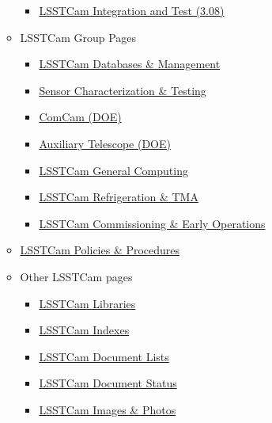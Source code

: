 \begin{small}
\begin{itemize}
\begin{itemize}
\begin{itemize}
			\item \href{https://confluence.slac.stanford.edu/display/LSSTCAM/3.08+Integration+and+Test}{LSSTCam Integration and Test (3.08)}
		\end{itemize}
		\item LSSTCam Group Pages
		\begin{itemize}
			\item \href{https://confluence.slac.stanford.edu/display/LSSTCAM/Camera+Database+and+Data+Management}{LSSTCam Databases \& Management}
			\item \href{https://confluence.slac.stanford.edu/pages/viewpage.action?pageId=132230553}{Sensor Characterization \& Testing}
			\item \href{https://confluence.slac.stanford.edu/display/LSSTCAM/Commissioning+Camera}{ComCam (DOE)}
			\item \href{https://confluence.slac.stanford.edu/display/LSSTCAM/Auxiliary+Telescope}{Auxiliary Telescope (DOE)}
			\item \href{https://confluence.slac.stanford.edu/display/LSSTCAM/General+Computing}{LSSTCam General Computing}
			\item \href{https://confluence.slac.stanford.edu/display/LSSTCAM/Refrigeration+and+the+TMA}{LSSTCam Refrigeration \& TMA}
			\item \href{https://confluence.slac.stanford.edu/display/LSSTCAM/Commissioning+and+Early+Operations}{LSSTCam Commissioning \& Early Operations}
		\end{itemize}
		\item \href{https://confluence.slac.stanford.edu/display/LSSTCAM/Camera+Policies+and+Procedures}{LSSTCam Policies \& Procedures}
		\item Other LSSTCam pages
		\begin{itemize}
			\item \href{https://confluence.slac.stanford.edu/display/LSSTCAM/Site+Indexes+and+Libraries}{LSSTCam Libraries}
			\item \href{https://confluence.slac.stanford.edu/display/LSSTCAM/LSSTCAM+Site+Indexes}{LSSTCam Indexes}
			\item \href{https://confluence.slac.stanford.edu/display/LSSTCAM/Camera+Working+Documents+Lists}{LSSTCam Document Lists}
			\item \href{https://confluence.slac.stanford.edu/display/LSSTCAM/Camera+Document+Status}{LSSTCam Document Status}
			\item \href{https://confluence.slac.stanford.edu/pages/viewpage.action?pageId=165088106}{LSSTCam Images \& Photos}

\end{itemize}
\end{itemize}
\end{itemize}
\end{small}

